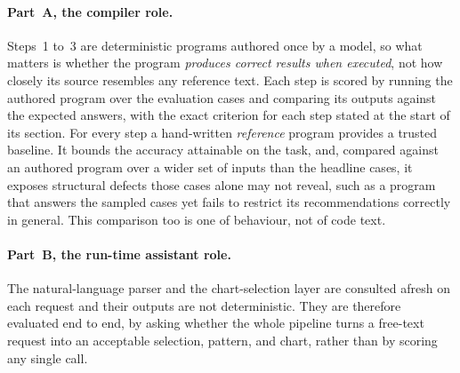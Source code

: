 \paragraph{Part~A, the compiler role.} Steps~1 to~3 are deterministic programs authored once by a model, so what matters is whether the program \emph{produces correct results when executed}, not how closely its source resembles any reference text. Each step is scored by running the authored program over the evaluation cases and comparing its outputs against the expected answers, with the exact criterion for each step stated at the start of its section. For every step a hand-written \emph{reference} program provides a trusted baseline. It bounds the accuracy attainable on the task, and, compared against an authored program over a wider set of inputs than the headline cases, it exposes structural defects those cases alone may not reveal, such as a program that answers the sampled cases yet fails to restrict its recommendations correctly in general. This comparison too is one of behaviour, not of code text.

\paragraph{Part~B, the run-time assistant role.} The natural-language parser and the chart-selection layer are consulted afresh on each request and their outputs are not deterministic. They are therefore evaluated end to end, by asking whether the whole pipeline turns a free-text request into an acceptable selection, pattern, and chart, rather than by scoring any single call.

